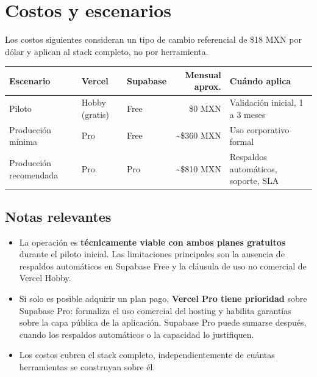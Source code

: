 \documentclass[12pt,a4paper]{article}
\begin{document}
\section{Costos y escenarios}

Los costos siguientes consideran un tipo de cambio referencial de \$18 MXN por dólar
y aplican al stack completo, no por herramienta.

\begin{tabularx}{\textwidth}{@{}l l l r >{\raggedright\arraybackslash}X@{}}
\toprule
\textbf{Escenario} & \textbf{Vercel} & \textbf{Supabase} & \textbf{Mensual aprox.} & \textbf{Cuándo aplica} \\
\midrule
Piloto                  & Hobby (gratis) & Free  & \$0 MXN          & Validación inicial, 1 a 3 meses \\
Producción mínima       & Pro            & Free  & \textasciitilde\$360 MXN & Uso corporativo formal \\
Producción recomendada  & Pro            & Pro   & \textasciitilde\$810 MXN & Respaldos automáticos, soporte, SLA \\
\bottomrule
\end{tabularx}

\subsection*{Notas relevantes}

\begin{itemize}
  \item La operación es \textbf{técnicamente viable con ambos planes gratuitos}
        durante el piloto inicial.
        Las limitaciones principales son la ausencia de respaldos automáticos en Supabase Free
        y la cláusula de uso no comercial de Vercel Hobby.
  \item Si solo es posible adquirir un plan pago,
        \textbf{Vercel Pro tiene prioridad} sobre Supabase Pro:
        formaliza el uso comercial del hosting
        y habilita garantías sobre la capa pública de la aplicación.
        Supabase Pro puede sumarse después,
        cuando los respaldos automáticos o la capacidad lo justifiquen.
  \item Los costos cubren el stack completo,
        independientemente de cuántas herramientas se construyan sobre él.
\end{itemize}
\end{document}
